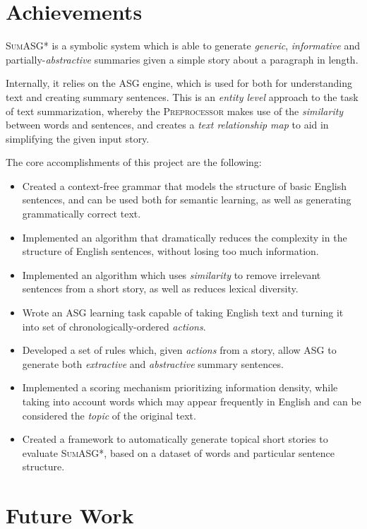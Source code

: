 \section{Achievements}

\textsc{SumASG*} is a symbolic system which is able to generate \textit{generic}, \textit{informative} and partially-\textit{abstractive} summaries given a simple story about a paragraph in length.

Internally, it relies on the ASG engine, which is used for both for understanding text and creating summary sentences. This is an \textit{entity level} approach to the task of text summarization, whereby the \textsc{Preprocessor} makes use of the \textit{similarity} between words and sentences, and creates a \textit{text relationship map} to aid in simplifying the given input story.

The core accomplishments of this project are the following:

\begin{itemize}
\item Created a context-free grammar that models the structure of basic English sentences, and can be used both for semantic learning, as well as generating grammatically correct text.
\item Implemented an algorithm that dramatically reduces the complexity in the structure of English sentences, without losing too much information.
\item Implemented an algorithm which uses \textit{similarity} to remove irrelevant sentences from a short story, as well as reduces lexical diversity.
\item Wrote an ASG learning task capable of taking English text and turning it into set of chronologically-ordered \textit{actions}.
\item Developed a set of rules which, given \textit{actions} from a story, allow ASG to generate both \textit{extractive} and \textit{abstractive} summary sentences.
\item Implemented a scoring mechanism prioritizing information density, while taking into account words which may appear frequently in English and can be considered the \textit{topic} of the original text.
\item Created a framework to automatically generate topical short stories to evaluate \textsc{SumASG*}, based on a dataset of words and particular sentence structure.
\end{itemize}

\section{Future Work}

